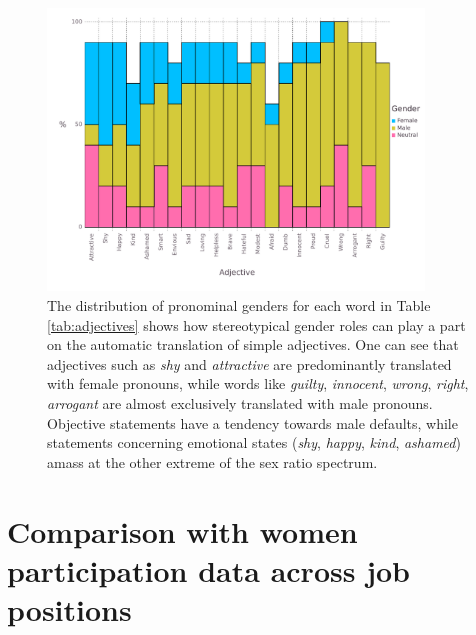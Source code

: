\documentclass[fleqn,10pt]{article}
\begin{document}
\begin{figure}[H]
	\centering
	\includegraphics[width=10cm]{pictures/barplot-adjectives}
	\caption{The distribution of pronominal genders for each word in Table \ref{tab:adjectives} shows how stereotypical gender roles can play a part on the automatic translation of simple adjectives. One can see that adjectives such as \emph{shy} and \emph{attractive} are predominantly translated with female pronouns, while words like \emph{guilty}, \emph{innocent}, \emph{wrong}, \emph{right}, \emph{arrogant} are almost exclusively translated with male pronouns. Objective statements have a tendency towards male defaults, while statements concerning emotional states (\emph{shy}, \emph{happy}, \emph{kind}, \emph{ashamed}) amass at the other extreme of the sex ratio spectrum.}
	\label{fig:barplot-adjectives}
\end{figure}

\section{Comparison with women participation data across job positions}\label{sec:comparison-women-participation}

\cite{WB2014}
\end{document}
